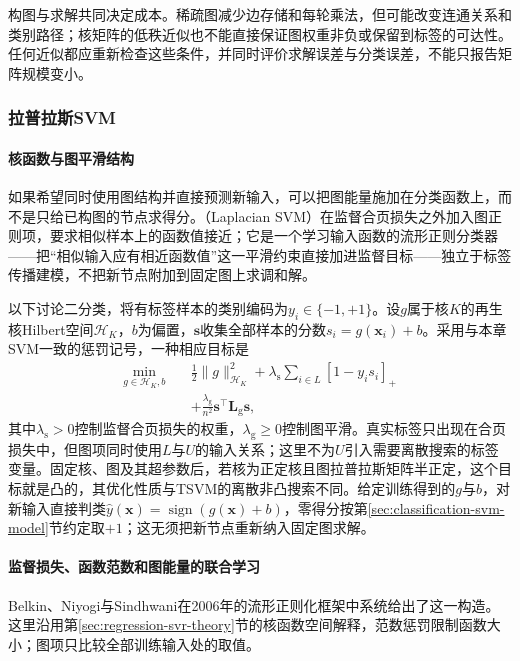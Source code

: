 构图与求解共同决定成本。稀疏图减少边存储和每轮乘法，但可能改变连通关系和类别路径；核矩阵的低秩近似也不能直接保证图权重非负或保留到标签的可达性。任何近似都应重新检查这些条件，并同时评价求解误差与分类误差，不能只报告矩阵规模变小。

\subsubsection{拉普拉斯SVM}
\label{sec:classification-laplacian-svm}

\paragraph{核函数与图平滑结构}
如果希望同时使用图结构并直接预测新输入，可以把图能量施加在分类函数上，而不是只给已构图的节点求得分。（Laplacian SVM）在监督合页损失之外加入图正则项，要求相似样本上的函数值接近；它是一个学习输入函数的流形正则分类器——把“相似输入应有相近函数值”这一平滑约束直接加进监督目标——独立于标签传播建模，不把新节点附加到固定图上求调和解。

以下讨论二分类，将有标签样本的类别编码为$y_i\in\{-1,+1\}$。设$g$属于核$K$的再生核Hilbert空间$\mathcal{H}_K$，$b$为偏置，$\bm{s}$收集全部样本的分数$s_i=g(\bm{x}_i)+b$。采用与本章SVM一致的惩罚记号，一种相应目标是
\begin{equation}
  \label{eq:classification-laplacian-svm}
  \begin{aligned}
    \min_{g\in\mathcal{H}_K,b}\quad
      &\frac12\lVert g\rVert_{\mathcal{H}_K}^2
       +\lambda_{\mathrm{s}}\sum_{i\in L}[1-y_i s_i]_+\\
      &+\frac{\lambda_{\mathrm{g}}}{n^2}
        \bm{s}^{\top}\bm{L}_{\mathrm{g}}\bm{s},
  \end{aligned}
\end{equation}
其中$\lambda_{\mathrm{s}}>0$控制监督合页损失的权重，$\lambda_{\mathrm{g}}\geq0$控制图平滑。真实标签只出现在合页损失中，但图项同时使用$L$与$U$的输入关系；这里不为$U$引入需要离散搜索的标签变量。固定核、图及其超参数后，若核为正定核且图拉普拉斯矩阵半正定，这个目标就是凸的，其优化性质与TSVM的离散非凸搜索不同。给定训练得到的$g$与$b$，对新输入直接判类$\hat y(\bm{x})=\operatorname{sign}(g(\bm{x})+b)$，零得分按第\ref{sec:classification-svm-model}节约定取$+1$；这无须把新节点重新纳入固定图求解。

\paragraph{监督损失、函数范数和图能量的联合学习}
Belkin、Niyogi与Sindhwani在2006年的流形正则化框架中系统给出了这一构造。这里沿用第\ref{sec:regression-svr-theory}节的核函数空间解释，范数惩罚限制函数大小；图项只比较全部训练输入处的取值。

